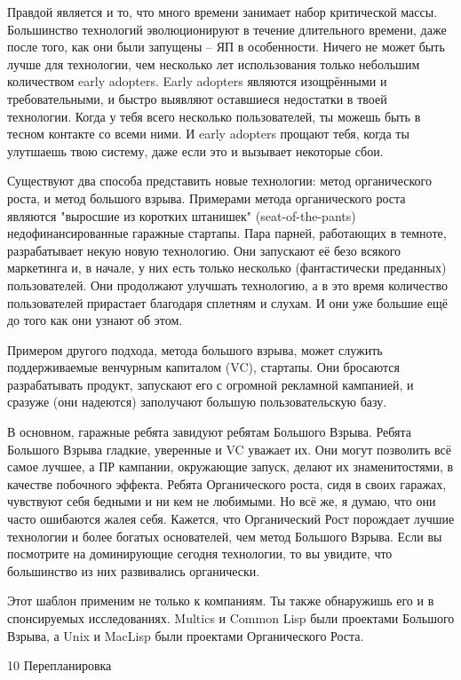 \documentclass[ebook,12pt,oneside,openany]{memoir}
\begin{document}
Правдой является и то, что много времени занимает набор критической
массы. Большинство технологий эволюционируют в течение длительного
времени, даже после того, как они были запущены -- ЯП в особенности.
Ничего не может быть лучше для технологии, чем несколько лет
использования только небольшим количеством early adopters. Early
adopters являются изощрёнными и требовательными, и быстро выявляют
оставшиеся недостатки в твоей технологии. Когда у тебя всего несколько
пользователей, ты можешь быть в тесном контакте со всеми ними. И early
adopters прощают тебя, когда ты улутшаешь твою систему, даже если это
и вызывает некоторые сбои.

Существуют два способа представить новые технологии: метод
органического роста, и метод большого взрыва. Примерами метода
органического роста являются "выросшие из коротких штанишек"
(seat-of-the-pants) недофинансированные гаражные стартапы. Пара
парней, работающих в темноте, разрабатывает некую новую технологию.
Они запускают её безо всякого маркетинга и, в начале, у них есть
только несколько (фантастически преданных) пользователей. Они
продолжают улучшать технологию, а в это время количество пользователей
прирастает благодаря сплетням и слухам. И они уже большие ещё до того
как они узнают об этом.

Примером другого подхода, метода большого взрыва, может служить
поддерживаемые венчурным капиталом (VC), стартапы. Они бросаются
разрабатывать продукт, запускают его с огромной рекламной кампанией, и
сразуже (они надеются) заполучают большую пользовательскую базу.

В основном, гаражные ребята завидуют ребятам Большого Взрыва. Ребята
Большого Взрыва гладкие, уверенные и VC уважает их. Они могут
позволить всё самое лучшее, а ПР кампании, окружающие запуск, делают
их знаменитостями, в качестве побочного эффекта. Ребята Органического
роста, сидя в своих гаражах, чувствуют себя бедными и ни кем не
любимыми. Но всё же, я думаю, что они часто ошибаются жалея себя.
Кажется, что Органический Рост порождает лучшие технологии и более
богатых основателей, чем метод Большого Взрыва. Если вы посмотрите на
доминирующие сегодня технологии, то вы увидите, что большинство из них
развивались органически.

Этот шаблон применим не только к компаниям. Ты также обнаружишь его и
в спонсируемых исследованиях. Multics и Common Lisp были проектами
Большого Взрыва, а Unix и MacLisp были проектами Органического Роста.

10 Перепланировка
\end{document}
